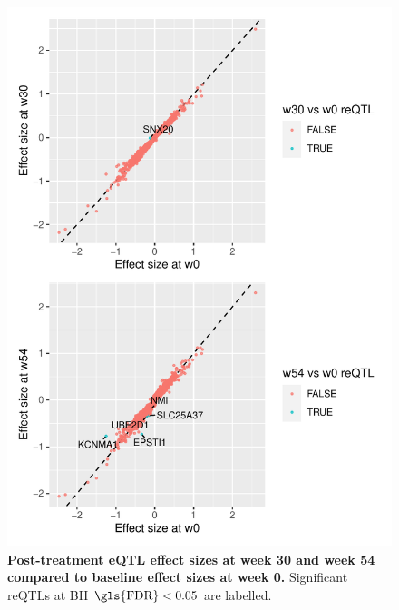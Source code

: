 
\begin{figure}
    \centering
    \includegraphics[width=1.0\textwidth,page=1]{mainmatter/figures/chapter_04/plot_dge_eqtl.pm_w30_vs_w0_and_w54_vs_w0}
    \caption[
    ]{
        \textbf{Post-treatment \gls{eQTL} effect sizes at week 30 and week 54 compared to baseline effect sizes at week 0.}
        Significant \glspl{reQTL} at \gls{BH} $\text{\gls{FDR}} < 0.05$ are labelled.
    }
    \label{fig:multipants_reQTL_pm_w30_vs_w0_and_w54_vs_w0}
\end{figure}

